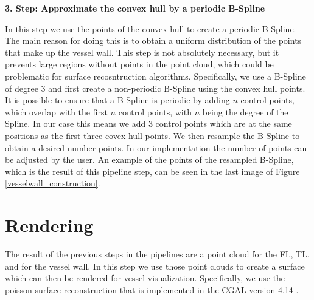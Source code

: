 \documentclass[thesis.tex]{subfiles}
\begin{document}
\textbf{3. Step: Approximate the convex hull by a periodic B-Spline}

In this step we use the points of the convex hull to create a periodic B-Spline. The main reason for doing this is to obtain a uniform distribution of the points that make up the vessel wall. This step is not absolutely necessary, but it prevents large regions without points in the point cloud, which could be problematic for surface recosntruction algorithms. Specifically, we use a B-Spline of degree $3$ and first create a non-periodic B-Spline using the convex hull points. It is possible to ensure that a B-Spline is periodic by adding $n$ control points, which overlap with the first $n$ control points, with $n$ being the degree of the Spline. In our case this means we add $3$ control points which are at the same positions as the first three covex hull points. We then resample the B-Spline to obtain a desired number points. In our implementation the number of points can be adjusted by the user. An example of the points of the resampled B-Spline, which is the result of this pipeline step, can be seen in the last image of Figure \ref{vesselwall_construction}.

\section{Rendering}

The result of the previous steps in the pipelines are a point cloud for the FL, TL, and for the vessel wall. In this step we use those point clouds to create a surface which can then be rendered for vessel visualization. Specifically, we use the poisson surface reconstruction \cite{kazhdan2006poisson} that is implemented in the CGAL version 4.14 \cite{cgal}. 
\end{document}
